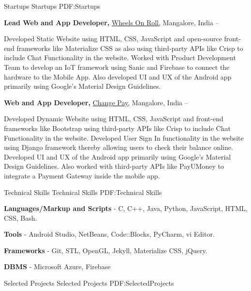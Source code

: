 \documentclass[letterpaper,MMMyyyy,nonstopmode]{simpleresumecv}
\begin{document}
\begin{Body}
\SubSection
{Startups}
{Startups}
{PDF:Startups}

\Entry
\textbf{Lead Web and App Developer,}
\textcolor{blue}{
\href{http://wheelsonroll.com/}
{Wheels On Roll,}
}
Mangalore, India
\hfill
{} --

\Gap
\BulletItem
Developed Static Website using HTML, CSS, JavaScript and open-source front-end frameworks like Materialize CSS as also using third-party APIs like Crisp to include Chat Functionality in the website.
\BulletItem
Worked with Product Development Team to develop an IoT framework using Sanic and Firebase to connect the hardware to the Mobile App. Also developed UI and UX of the Android app primarily using Google's Material Design Guidelines.
\Gap

\Entry
\textbf{Web and App Developer,}
\textcolor{blue}{
\href{http://changepay.in/}
{Change Pay,}
}
Mangalore, India
\hfill
{} --

\Gap
\BulletItem
Developed Dynamic Website using HTML, CSS, JavaScript and front-end frameworks like Bootstrap using third-party APIs like Crisp to include Chat Functionality in the website.
\BulletItem
Developed User Sign In functionality in the website using Django framework thereby allowing users to check their balance online.
\BulletItem
Developed UI and UX of the Android app primarily using Google's Material Design Guidelines. Also worked with third-party APIs like PayUMoney to integrate a Payment Gateway inside the mobile app.


\Section
{Technical Skills}
{Technical Skills}
{PDF:Technical Skills}

\Entry
\textbf{Languages/Markup and Scripts}
- C, C++, Java, Python, JavaScript, HTML, CSS, Bash.
\Gap

\textbf{Tools}
- Android Studio, NetBeans, Code::Blocks, PyCharm, vi Editor.
\Gap

\textbf{Frameworks}
- Git, STL, OpenGL, Jekyll, Materialize CSS, jQuery.
\Gap

\textbf{DBMS}
- Microsoft Azure, Firebase

\BigGap


\Section
{Selected Projects}
{Selected Projects}
{PDF:SelectedProjects}


\end{Body}
\end{document}

